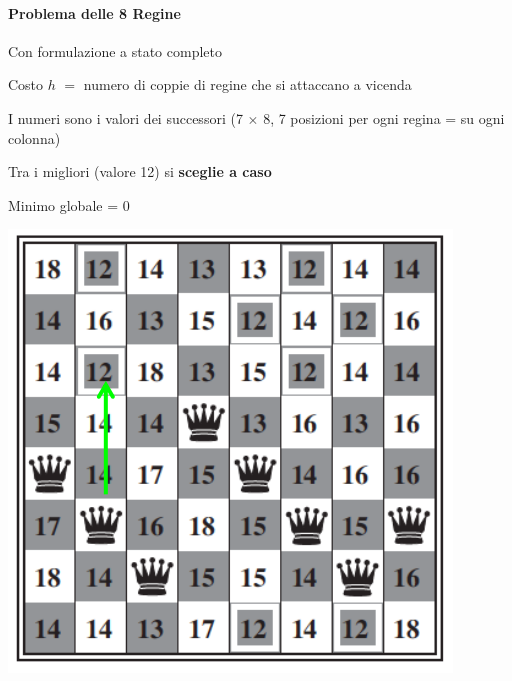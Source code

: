 \documentclass[10pt]{book}
\begin{document}
\paragraph{Problema delle 8 Regine} Con formulazione a stato completo
\begin{multicols}{2}
\begin{list}{}{}
	\item Costo $h$ $=$ numero di coppie di regine che si attaccano a vicenda
	\item I numeri sono i valori dei successori (7 $\times$ 8, 7 posizioni per ogni regina = su ogni colonna)
	\item Tra i migliori (valore 12) si \textbf{sceglie a caso}
	\item Minimo globale = 0
\end{list}
\begin{center}
	\includegraphics[scale=0.6]{8regstatcomp.png}
\end{center}
\end{multicols}
\end{document}
